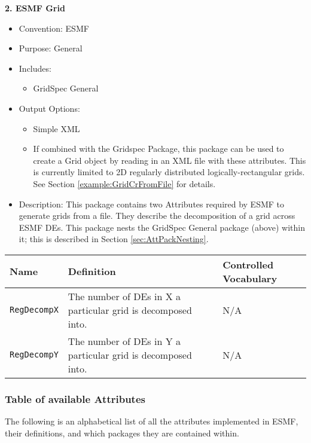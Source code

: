 \vspace{.20in}

{\bf 2. ESMF Grid}

\label{ESMFGridAttributePackage}

\begin{itemize}
    \item Convention: ESMF
    \item Purpose: General
    \item Includes: 
    \begin{itemize}
        \item GridSpec General
    \end{itemize}
    \item Output Options:
    \begin{itemize}
        \item Simple XML
        \item If combined with the Gridspec Package, this package can be used to create a Grid object by reading in an XML file with these attributes. This is currently limited to 2D regularly distributed logically-rectangular grids. See Section \ref{example:GridCrFromFile} for details. 
    \end{itemize}
    \item Description: This package contains two Attributes required by ESMF to generate grids from a file. They describe the decomposition of a grid across ESMF DEs.  This package nests the GridSpec General package (above) within it; this is described in Section \ref{sec:AttPackNesting}.
\end{itemize}

\begin{longtable}{|p{5cm}|p{5cm}|p{4cm}|}
\hline\hline
{\bf Name} & {\bf Definition} & {\bf Controlled Vocabulary} \\
\hline\hline
{\tt RegDecompX} & The number of DEs in X a particular grid is decomposed into.& N/A\\
{\tt RegDecompY} & The number of DEs in Y a particular grid is decomposed into.& N/A\\
\hline\hline
\end{longtable}

\vspace{.20in}

\subsubsection{Table of available Attributes}

The following is an alphabetical list of all the attributes implemented in ESMF, their definitions, and which packages they are contained within. 

